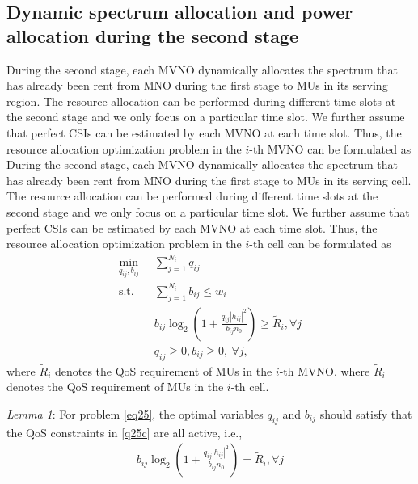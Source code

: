 \documentclass[journal]{IEEEtran}
\begin{document}
\begin{IEEEkeywords}
\section{Dynamic spectrum allocation and power allocation during the second stage}
During the second stage, each MVNO dynamically allocates the spectrum that has already been rent from MNO during the first stage to MUs in its serving region. The resource allocation can be performed during different time slots at the second stage and we only focus on a particular time slot. We further assume that perfect CSIs can be estimated by each MVNO at each time slot. Thus, the resource allocation optimization problem in the $i$-th MVNO can be formulated as
During the second stage, each MVNO dynamically allocates the spectrum that has already been rent from MNO during the first stage to MUs in its serving cell. The resource allocation can be performed during different time slots at the second stage and we only focus on a particular time slot. We further assume that perfect CSIs can be estimated by each MVNO at each time slot. Thus, the resource allocation optimization problem in the $i$-th cell can be formulated as
\begin{subequations}\label{eq25}
	\begin{align}
	\min_{q_{ij}, b_{ij}}\ & \sum\limits_{j = 1}^{N_i} q_{ij} \label{q25a} \\ \mbox{s.t.} \quad &  \sum\limits_{j = 1}^{N_i} b_{ij} \leq w_i \label{q25b} \\ \quad &  b_{ij}\log_2\left(1 + \frac{q_{ij}\left|h_{ij}\right|^2}{b_{ij}n_0}\right) \geq \tilde{R}_i, \forall j \label{q25c}\\
	& q_{ij} \geq 0, b_{ij} \geq 0, \ \forall j, \label{q25d}
	\end{align}
\end{subequations}
where $\tilde{R}_i$ denotes the QoS requirement of MUs in the $i$-th MVNO.
where $\tilde{R}_i$ denotes the QoS requirement of MUs in the $i$-th cell.

\textit{Lemma 1}: For problem \eqref{eq25}, the optimal variables $q_{ij}$ and $b_{ij}$ should satisfy that the QoS constraints in \eqref{q25c} are all active, i.e., 
\begin{align} \label{q26}
b_{ij}\log_2\left(1 + \frac{q_{ij}\left|h_{ij}\right|^2}{b_{ij}n_0}\right) = \tilde{R}_i,  \forall j
\end{align}


\end{IEEEkeywords}
\end{document}
